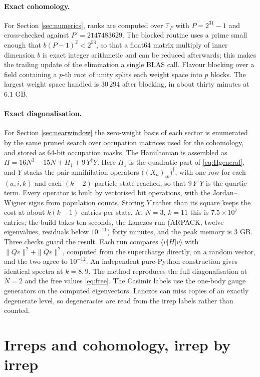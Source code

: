 \documentclass[10pt]{article}
\newcommand{\bQ}{\bar Q}
\begin{document}
\paragraph{Exact cohomology.} For Section \ref{sec:numerics}, ranks are computed over $\mathbb F_P$ with
$P=2^{31}-1$ and cross-checked against $P'=2147483629$. The blocked routine uses a prime small enough that
$b(P-1)^2<2^{53}$, so that a float64 matrix multiply of inner dimension $b$ is exact integer arithmetic and can
be reduced afterwards; this makes the trailing update of the elimination a single BLAS call. Flavour blocking
over a field containing a $p$-th root of unity splits each weight space into $p$ blocks. The largest weight
space handled is $30\,294$ after blocking, in about thirty minutes at $6.1$ GB.

\paragraph{Exact diagonalisation.} For Section \ref{sec:nearwindow} the zero-weight basis of each sector is
enumerated by the same pruned search over occupation matrices used for the cohomology, and stored as 64-bit
occupation masks. The Hamiltonian is assembled as $H=16N^3-15N+H_1+9\,Y^\dagger Y$. Here $H_1$ is the quadratic
part of \eqref{eq:Hgeneral}, and $Y$ stacks the pair-annihilation operators $\big((X_a)_{ik}\big)^\dagger$, with
one row for each $(a,i,k)$ and each $(k-2)$-particle state reached, so that $9\,Y^\dagger Y$ is the quartic term.
Every operator is built by vectorised bit operations, with the Jordan--Wigner signs from population counts.
Storing $Y$ rather than its square keeps the cost at about $k(k-1)$ entries per state. At $N=3$, $k=11$ this is
$7.5\times10^7$ entries; the build takes ten seconds, the Lanczos run (ARPACK, twelve eigenvalues, residuals below
$10^{-11}$) forty minutes, and the peak memory is $3$ GB. Three checks guard the result. Each run compares
$\langle v|H|v\rangle$ with $\|Qv\|^2+\|\bQ v\|^2$, computed from the supercharge directly, on a random vector, and
the two agree to $10^{-12}$. An independent pure-Python construction gives identical spectra at $k=8,9$. The
method reproduces the full diagonalisation at $N=2$ and the free values \eqref{eq:free}. The Casimir labels use the
one-body gauge generators on the computed eigenvectors. Lanczos can miss copies of an exactly degenerate level,
so degeneracies are read from the irrep labels rather than counted.

\section{Irreps and cohomology, irrep by irrep}\label{app:irreps}
\end{document}
